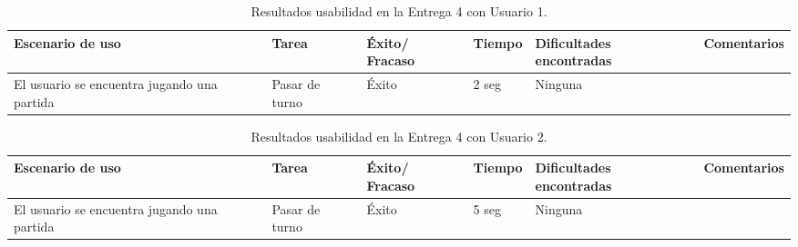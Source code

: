 \begin{table}[h]
  \begin{center}
    \begin{tabular}{|p{2.5cm}|p{1.75cm}|p{1.25cm}|p{1.25cm}|p{2.75cm}|p{3.5cm}|}

      \hline
        \rowcolor{Gray} \textbf{Escenario de uso}
        & \textbf{Tarea}
        & \textbf{Éxito/ Fracaso}
        & \textbf{Tiempo}
        & \textbf{Dificultades encontradas}
        & \textbf{Comentarios}\\

        \hline
        El usuario se encuentra jugando una partida
        & Pasar de turno
        & Éxito
        & 2 seg
        & Ninguna
        &\\

      \hline

    \end{tabular}

    \caption{Resultados usabilidad en la Entrega 4 con Usuario 1.}
    \label{tabla-entrega-4-usuario1}

  \end{center}
\end{table}


\begin{table}[h]
  \begin{center}
    \begin{tabular}{|p{2.5cm}|p{1.75cm}|p{1.25cm}|p{1.25cm}|p{2.75cm}|p{3.5cm}|}

      \hline
        \rowcolor{Gray} \textbf{Escenario de uso}
        & \textbf{Tarea}
        & \textbf{Éxito/ Fracaso}
        & \textbf{Tiempo}
        & \textbf{Dificultades encontradas}
        & \textbf{Comentarios}\\

        \hline
        El usuario se encuentra jugando una partida
        & Pasar de turno
        & Éxito
        & 5 seg
        & Ninguna
        &\\

      \hline

    \end{tabular}

    \caption{Resultados usabilidad en la Entrega 4 con Usuario 2.}
    \label{tabla-entrega-4-usuario2}

  \end{center}
\end{table}


